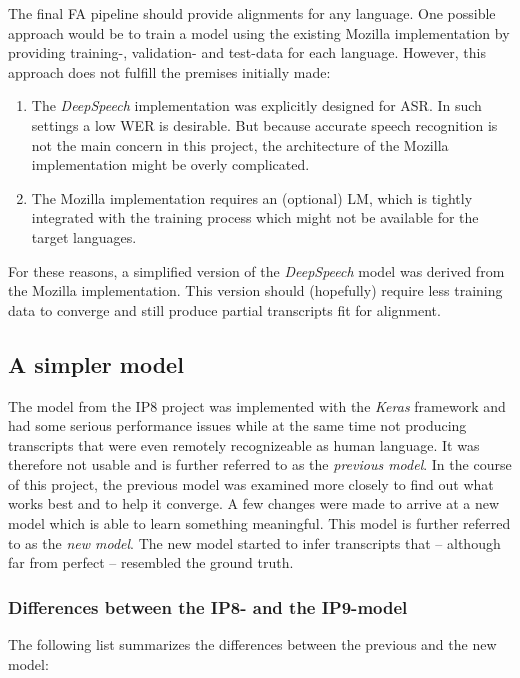 The final \ac{FA} pipeline should provide alignments for any language. One possible approach would be to train a model using the existing Mozilla implementation by providing training-, validation- and test-data for each language. However, this approach does not fulfill the premises initially made:

\begin{enumerate}
	\item The \textit{DeepSpeech} implementation was explicitly designed for \ac{ASR}. In such settings a low \ac{WER} is desirable. But because accurate speech recognition is not the main concern in this project, the architecture of the Mozilla implementation might be overly complicated.
	\item The Mozilla implementation requires an (optional) \ac{LM}, which is tightly integrated with the training process which might not be available for the target languages.
\end{enumerate}

For these reasons, a simplified version of the \textit{DeepSpeech} model was derived from the Mozilla implementation. This version should (hopefully) require less training data to converge and still produce partial transcripts fit for alignment.

\subsection{A simpler model}

The model from the IP8 project was implemented with the \textit{Keras} framework and had some serious performance issues while at the same time not producing transcripts that were even remotely recognizeable as human language. It was therefore not usable and is further referred to as the \textit{previous model}. In the course of this project, the previous model was examined more closely to find out what works best and to help it converge. A few changes were made to arrive at a new model which is able to learn something meaningful. This model is further referred to as the \textit{new model}. The new model started to infer transcripts that -- although far from perfect -- resembled the ground truth. 

\subsubsection{Differences between the IP8- and the IP9-model}
The following list summarizes the differences between the previous and the new model:

